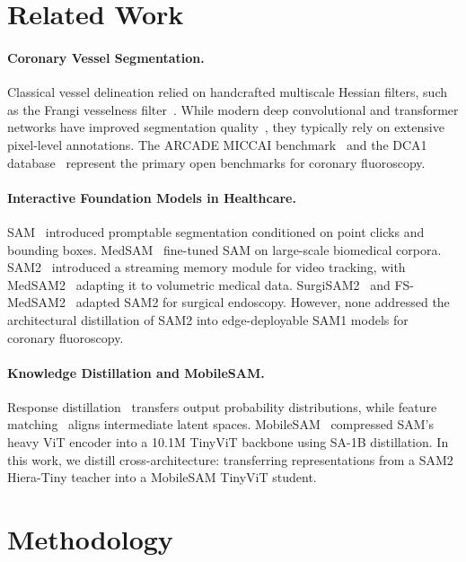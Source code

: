 \documentclass[10pt,twocolumn]{article}
\begin{document}
\section{Related Work}

\paragraph{Coronary Vessel Segmentation.}
Classical vessel delineation relied on handcrafted multiscale Hessian filters, such as the Frangi vesselness filter~\citep{frangi}. While modern deep convolutional and transformer networks have improved segmentation quality~\citep{zhang2025xca, chang2024xca}, they typically rely on extensive pixel-level annotations. The ARCADE MICCAI benchmark~\citep{arcade} and the DCA1 database~\citep{dca1} represent the primary open benchmarks for coronary fluoroscopy.

\paragraph{Interactive Foundation Models in Healthcare.}
SAM~\citep{sam} introduced promptable segmentation conditioned on point clicks and bounding boxes. MedSAM~\citep{medsam} fine-tuned SAM on large-scale biomedical corpora. SAM2~\citep{sam2} introduced a streaming memory module for video tracking, with MedSAM2~\citep{medsam2} adapting it to volumetric medical data. SurgiSAM2~\citep{surgisam2} and FS-MedSAM2~\citep{fsmedsam2} adapted SAM2 for surgical endoscopy. However, none addressed the architectural distillation of SAM2 into edge-deployable SAM1 models for coronary fluoroscopy.

\paragraph{Knowledge Distillation and MobileSAM.}
Response distillation~\citep{hinton2015distilling} transfers output probability distributions, while feature matching~\citep{romero2014fitnets} aligns intermediate latent spaces. MobileSAM~\citep{zhang2023mobilesam} compressed SAM's heavy ViT encoder into a 10.1M TinyViT backbone using SA-1B distillation. In this work, we distill cross-architecture: transferring representations from a SAM2 Hiera-Tiny teacher into a MobileSAM TinyViT student.

\section{Methodology}
\end{document}
